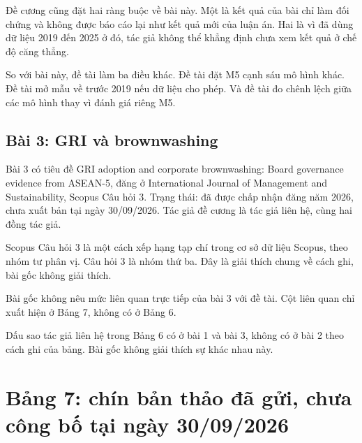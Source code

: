 Đề cương cũng đặt hai ràng buộc về bài này. Một là kết quả của bài chỉ làm đối chứng và không được báo cáo lại như kết quả mới của luận án. Hai là vì đã dùng dữ liệu 2019 đến 2025 ở đó, tác giả không thể khẳng định chưa xem kết quả ở chế độ căng thẳng.

So với bài này, đề tài làm ba điều khác. Đề tài đặt M5 cạnh sáu mô hình khác. Đề tài mở mẫu về trước 2019 nếu dữ liệu cho phép. Và đề tài đo chênh lệch giữa các mô hình thay vì đánh giá riêng M5.

\subsection{Bài 3: GRI và brownwashing}

Bài 3 có tiêu đề GRI adoption and corporate brownwashing: Board governance evidence from ASEAN-5, đăng ở International Journal of Management and Sustainability, Scopus Câu hỏi 3. Trạng thái: đã được chấp nhận đăng năm 2026, chưa xuất bản tại ngày 30/09/2026. Tác giả đề cương là tác giả liên hệ, cùng hai đồng tác giả.

Scopus Câu hỏi 3 là một cách xếp hạng tạp chí trong cơ sở dữ liệu Scopus, theo nhóm tư phân vị. Câu hỏi 3 là nhóm thứ ba. Đây là giải thích chung về cách ghi, bài gốc không giải thích.

Bài gốc không nêu mức liên quan trực tiếp của bài 3 với đề tài. Cột liên quan chỉ xuất hiện ở Bảng 7, không có ở Bảng 6.

Dấu sao tác giả liên hệ trong Bảng 6 có ở bài 1 và bài 3, không có ở bài 2 theo cách ghi của bảng. Bài gốc không giải thích sự khác nhau này.

\section{Bảng 7: chín bản thảo đã gửi, chưa công bố tại ngày 30/09/2026}

